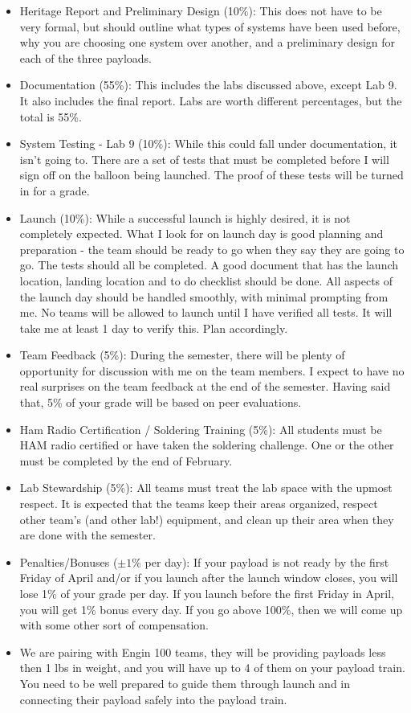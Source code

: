 \documentclass[11pt]{article}
\begin{document}
\begin{itemize}
  \item Heritage Report and Preliminary Design (10\%): This does not
    have to be very formal, but should outline what types of systems
    have been used before, why you are choosing one system over
    another, and a preliminary design for each of the three payloads.
  \item Documentation (55\%): This includes the labs discussed above,
    except Lab 9. It also includes the final report. Labs are worth
    different percentages, but the total is 55\%.
    \item System Testing - Lab 9 (10\%): While this could fall under
      documentation, it isn’t going to. There are a set of tests that
      must be completed before I will sign off on the balloon being
      launched. The proof of these tests will be turned in for a
      grade.
    \item Launch (10\%): While a successful launch is highly desired,
      it is not completely expected. What I look for on launch day is
      good planning and preparation - the team should be ready to go
      when they say they are going to go. The tests should all be
      completed. A good document that has the launch location, landing
      location and to do checklist should be done. All aspects of the
      launch day should be handled smoothly, with minimal prompting
      from me. No teams will be allowed to launch until I have
      verified all tests. It will take me at least 1 day to verify
      this. Plan accordingly.
    \item Team Feedback (5\%): During the semester, there will be
      plenty of opportunity for discussion with me on the team
      members. I expect to have no real surprises on the team feedback
      at the end of the semester.  Having said that, 5\% of your grade
      will be based on peer evaluations.
    \item Ham Radio Certification / Soldering Training (5\%): All
      students must be HAM radio certified or have taken the soldering
      challenge. One or the other must be completed by the end of
      February.
    \item Lab Stewardship (5\%): All teams must treat the lab space
      with the upmost respect. It is expected that the teams keep
      their areas organized, respect other team’s (and other lab!)
      equipment, and clean up their area when they are done with the
      semester.
    \item Penalties/Bonuses ($\pm 1$\% per day): If your payload is
      not ready by the first Friday of April and/or if you launch
      after the launch window closes, you will lose 1\% of your grade
      per day. If you launch before the first Friday in April, you
      will get 1\% bonus every day. If you go above 100\%, then we
      will come up with some other sort of compensation.
    \item We are pairing with Engin 100 teams, they will be providing
      payloads less then 1 lbs in weight, and you will have up to 4 of
      them on your payload train. You need to be well prepared to
      guide them through launch and in connecting their payload safely
      into the payload train.
\end{itemize}
\end{document}
